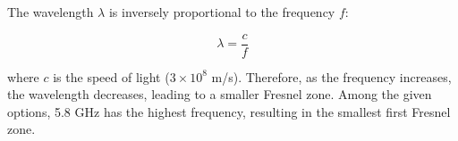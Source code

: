 The wavelength \( \lambda \) is inversely proportional to the frequency \( f \):

\[
\lambda = \frac{c}{f}
\]

where \( c \) is the speed of light (\( 3 \times 10^8 \) m/s). Therefore, as the frequency increases, the wavelength decreases, leading to a smaller Fresnel zone. Among the given options, 5.8 GHz has the highest frequency, resulting in the smallest first Fresnel zone.

